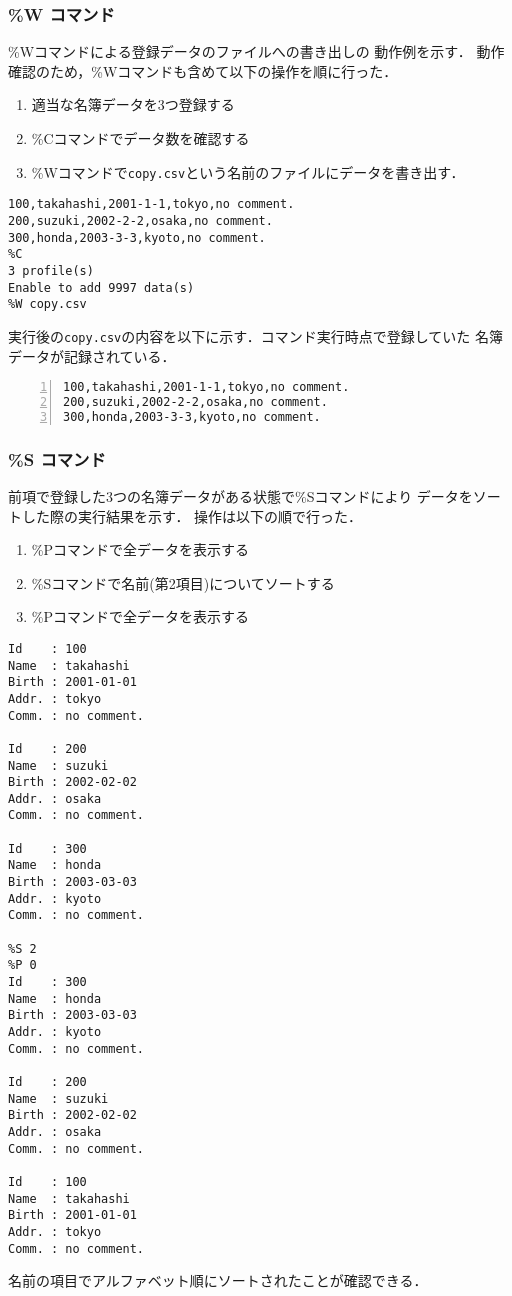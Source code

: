 \subsubsection{\%W コマンド}
\%Wコマンドによる登録データのファイルへの書き出しの
動作例を示す．
動作確認のため，\%Wコマンドも含めて以下の操作を順に行った．
\begin{enumerate}
  \item 適当な名簿データを3つ登録する
  \item \%Cコマンドでデータ数を確認する
  \item \%Wコマンドで\verb|copy.csv|という名前のファイルにデータを書き出す．
\end{enumerate}

\begin{Verbatim}[numbers=none, numbersep=6pt, frame=single,
  fontsize=\small, baselinestretch=0.8]
100,takahashi,2001-1-1,tokyo,no comment.
200,suzuki,2002-2-2,osaka,no comment.
300,honda,2003-3-3,kyoto,no comment.
%C
3 profile(s)
Enable to add 9997 data(s)
%W copy.csv  
\end{Verbatim}
実行後の\verb|copy.csv|の内容を以下に示す．コマンド実行時点で登録していた
名簿データが記録されている．
\begin{Verbatim}[numbers=left, numbersep=6pt, frame=single, xleftmargin=10mm,
  fontsize=\small, baselinestretch=0.8]
100,takahashi,2001-1-1,tokyo,no comment.
200,suzuki,2002-2-2,osaka,no comment.
300,honda,2003-3-3,kyoto,no comment.
\end{Verbatim}

\subsubsection{\%S コマンド}
前項で登録した3つの名簿データがある状態で\%Sコマンドにより
データをソートした際の実行結果を示す．
操作は以下の順で行った．
\begin{enumerate}
  \item \%Pコマンドで全データを表示する
  \item \%Sコマンドで名前(第2項目)についてソートする
  \item \%Pコマンドで全データを表示する
\end{enumerate}

\begin{Verbatim}[numbers=none, numbersep=6pt, frame=single,
  fontsize=\small, baselinestretch=0.8]
%P 0
Id    : 100
Name  : takahashi
Birth : 2001-01-01
Addr. : tokyo
Comm. : no comment.

Id    : 200
Name  : suzuki
Birth : 2002-02-02
Addr. : osaka
Comm. : no comment.

Id    : 300
Name  : honda
Birth : 2003-03-03
Addr. : kyoto
Comm. : no comment.

%S 2
%P 0
Id    : 300
Name  : honda
Birth : 2003-03-03
Addr. : kyoto
Comm. : no comment.

Id    : 200
Name  : suzuki
Birth : 2002-02-02
Addr. : osaka
Comm. : no comment.

Id    : 100
Name  : takahashi
Birth : 2001-01-01
Addr. : tokyo
Comm. : no comment.  
\end{Verbatim}
名前の項目でアルファベット順にソートされたことが確認できる．

